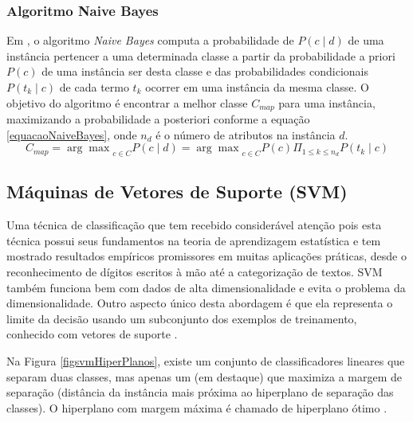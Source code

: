 \documentclass[
	12pt,				%
	openright,			%
	oneside,	
	a4paper,				%
	english,				%
	brazil				%
]{abntex2/abntex2} %
\begin{document}
	\subsubsection{Algoritmo Naive Bayes}
	\vspace{1\baselineskip}
	
	
	Em \cite{lucca:2013}, o algoritmo \textit{Naive Bayes} computa a probabilidade de $P(c \mid d)$ de uma instância pertencer a uma determinada classe a partir da probabilidade a priori $P(c)$ de uma instância ser desta classe e das probabilidades condicionais $P(t_k \mid c)$ de cada termo $t_k$ ocorrer em uma instância da mesma classe. O objetivo do algoritmo é encontrar a melhor classe $C_{map}$ para uma instância, maximizando a probabilidade a posteriori conforme a equação \ref{equacaoNaiveBayes}, onde $n_d$ é o número de atributos na instância $d$.
	\\
	
	\begin{equation}
	\label{equacaoNaiveBayes}
	C_{map} = {\arg \max}_{c \in C}P(c \mid d) = {\arg \max}_{c \in C}P(c) \Pi_{1 \leq k \leq n_d} P(t_k \mid c)
	\end{equation}
	
	
	\vspace{-1.5\baselineskip}
	\subsection{Máquinas de Vetores de Suporte (SVM)}
	\vspace{1\baselineskip}
	Uma técnica de classificação que tem recebido considerável atenção pois esta técnica possui seus fundamentos na teoria de aprendizagem estatística e tem mostrado resultados empíricos promissores em muitas aplicações práticas, desde o reconhecimento de dígitos escritos à mão até a categorização de textos. SVM também funciona bem com dados de alta dimensionalidade e evita o problema da dimensionalidade. Outro aspecto único desta abordagem é que ela representa o limite da decisão usando um subconjunto dos exemplos de treinamento, conhecido com vetores de suporte \cite{tan:2009}.
	
	Na Figura \ref{figsvmHiperPlanos}, existe um conjunto de classificadores lineares que separam duas classes, mas apenas um (em destaque) que maximiza a margem de separação (distância da instância mais próxima ao hiperplano de separação das classes). O hiperplano com margem máxima é chamado de hiperplano ótimo \cite{junior:2010}.
\end{document}

